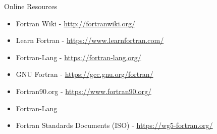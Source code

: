 \begin{frame}[fragile]{Online Resources}
\begin{itemize}
\item Fortran Wiki - \url{http://fortranwiki.org/} 
\item Learn Fortran - \url{https://www.learnfortran.com/} 
\item Fortran-Lang - \url{https://fortran-lang.org/}
\item GNU Fortran - \url{https://gcc.gnu.org/fortran/} 
\item Fortran90.org - \url{https://www.fortran90.org/} 
\item Fortran-Lang
\item Fortran Standards Documents (ISO) - \url{https://wg5-fortran.org/}
\end{itemize}
\end{frame}
